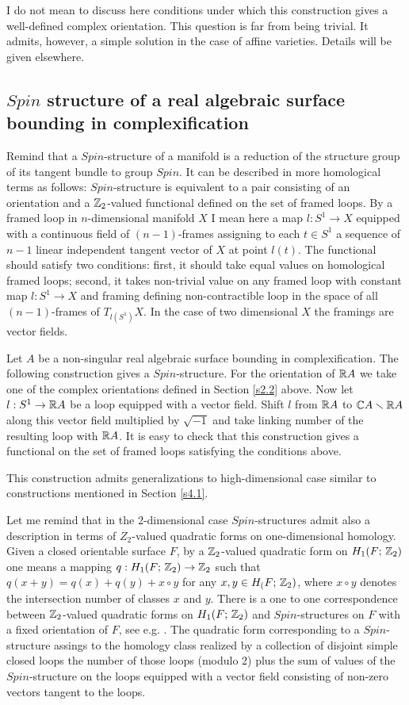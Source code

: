 \documentclass{article}
\numberwithin{equation}{section}
\begin{document}
I do not mean to discuss here conditions under which this construction
gives a well-defined complex orientation. This question is far from
being trivial. It admits, however, a simple solution in the case of
affine varieties. Details will be given elsewhere.

\subsection{$Spin$ structure of a real algebraic surface bounding in
complexification}\label{s4.2} 
Re\-mind that a $Spin$-structure of a manifold
is a reduction of the structure group of its tangent bundle to group
$Spin$.  It can be described in more homological terms as follows:
$Spin$-structure is equivalent to a pair consisting of an orientation
and a $\mathbb Z_2$-valued functional defined on the set of framed loops. By a
framed loop in $n$-dimensional manifold $X$  I  mean  here  a  map
$l:S^1\to  X$ equipped with a continuous field of $(n-1)$-frames
assigning to each $t\in S^1$ a sequence of $n-1$ linear independent
tangent vector of $X$ at point $l(t)$. The functional should satisfy
two conditions: first, it should take equal values on homological
 framed loops; second, it takes non-trivial value on any framed loop
with constant map $l:S^1\to X$ and framing defining non-contractible
loop in the space of all $(n-1)$-frames of $T_{l(S^1)}X$. In the case
of two dimensional $X$ the framings are vector fields.

Let $A$ be a non-singular real algebraic surface bounding in
complexification. The following construction gives a $Spin$-structure.
For the orientation of $\mathbb R A$ we take one of the complex orientations
defined in Section \ref{s2.2} above. Now let $l:S^1\to\mathbb R A$ be a loop equipped
with a vector field. Shift $l$ from $\mathbb R A$ to $\mathbb C A\smallsetminus\mathbb R A$
along this vector field multiplied by $\sqrt{-1}$ and take linking
number of the resulting loop with $\mathbb R A$. It is easy to check that this
construction gives a functional on the set of framed loops satisfying
the conditions above.

This construction admits generalizations to high-dimensional case
similar to constructions mentioned in Section \ref{s4.1}.

Let me remind that in the 2-dimensional case $Spin$-structures admit
also a description in terms of $Z_2$-valued quadratic forms on
one-dimensional homology.  Given a closed orientable surface $F$, by a
$\mathbb Z_2$-valued quadratic form on $H_1(F;\,\mathbb Z_2)$ one means a mapping
$q:H_1(F;\,\mathbb Z_2)\to\mathbb Z_2$ such that $q(x+y)=q(x)+q(y)+x\circ y$ for any
$x,y\in H_(F;\,\mathbb Z_2)$, where $x\circ y$ denotes the intersection number
of classes $x$ and $y$.  There is a one to one correspondence between
$\mathbb Z_2$-valued quadratic forms on $H_1(F;\,\mathbb Z_2)$  and $Spin$-structures
on $F$ with a fixed orientation of $F$, see e.g. \cite{J}. The
quadratic form corresponding to a $Spin$-structure assings to the
homology class realized  by a collection of disjoint simple closed
loops the number of those loops (modulo 2) plus the sum of values of
the $Spin$-structure on the loops equipped with a vector field
consisting of non-zero vectors tangent to the loops.
\end{document}
